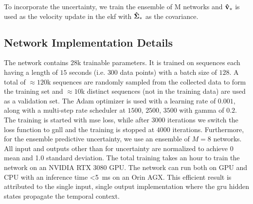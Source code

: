 To incorporate the uncertainty, we train the ensemble of $\mathrm{M}$ networks and $\mathbf{\hat{v}}_{*}$ is used as the velocity update in the \ac{ekf} with $\mathbf{\hat{\Sigma}}_{*}$ as the covariance.


\subsection{Network Implementation Details}
The network contains $28$k trainable parameters. It is trained on sequences each having a length of $15$ seconds (i.e. $300$ data points) with a batch size of $128$. A total of $\approx120$k sequences are randomly sampled from the collected data to form the training set and $\approx10$k distinct sequences (not in the training data) are used as a validation set. The Adam optimizer is used with a learning rate of $0.001$, along with a multi-step rate scheduler at $1500$, $2500$, $3500$ with gamma of $0.2$. The training is started with \ac{mse} loss, while after $3000$ iterations we switch the loss function to \ac{gnll} and the training is stopped at $4000$ iterations. Furthermore, for the ensemble predictive uncertainty, we use an ensemble of $M=8$ networks. All input and outputs other than for uncertainty are normalized to achieve 0 mean and 1.0 standard deviation. The total training takes an hour to train the network on an NVIDIA RTX $3080$ GPU. The network can run both on GPU and CPU with an inference time \SI{<5}{\milli\second} on an Orin AGX. This efficient result is attributed to the single input, single output implementation where the \ac{gru} hidden states propagate the temporal context.
